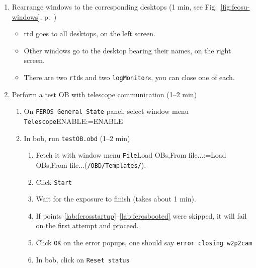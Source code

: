 \documentclass[11pt,fleqn]{book}
\makeatletter
\def\menu#1#2{\texttt{#1}\ifx{}#2\else\@for\@x:=#2\do{$\rightarrow$\texttt{\@x}}\fi}
\def\wmenu#1#2{window menu \menu{#1}{#2}}
\def\fetchob{\wmenu{File}{Load OBs,From file...}}
\def\figref#1{Fig.~\ref{fig:#1}, p.~\pageref{fig:#1}}
\makeatother
\begin{document}
\begin{enumerate}
\begin{enumerate}
\begin{enumerate}
                \item Wait for the large, grey window to close itself (3 min)
                \item\label{lab:ferosonline} Put the instrument online (1 min)
                \begin{enumerate}
                   \item On \texttt{FEROS General State} panel, use \wmenu{Instrument}{ONLINE}
                   \item Wait for \texttt{State} to indicate \texttt{ONLINE}
                \end{enumerate}
            \end{enumerate}
         \item \label{lab:ferosbooted} Rearrange windows to the corresponding desktops (1 min, see \figref{feosu-windows})
            \begin{itemize}
              \item \gls{rtd} goes to all desktops, on the left screen.
              \item Other windows go to the desktop bearing their names, on the right screen.
              \item There are two \texttt{rtd}s and two \texttt{logMonitor}s, you can close one of each.
           \end{itemize}
         \item Perform a test OB with telescope communication (1--2 min)
           \begin{enumerate}
             \item On \texttt{FEROS General State} panel, select \wmenu{Telescope}{ENABLE} 
             \item In \gls{bob}, run \texttt{testOB.obd} (1--2 min)
             \begin{enumerate}
               \item Fetch it with \fetchob (\texttt{/OBD/Templates/}).
               \item \label{list:ferostestob} Click \texttt{Start} 
               \item Wait for the exposure to finish (takes about 1 min).
               \item If points \ref{lab:ferosstartup}--\ref{lab:ferosbooted} were skipped, it will fail on the first attempt and proceed.
              \item Click \texttt{OK} on the error popups, one should say \texttt{error closing w2p2cam}
              \item In \gls{bob}, click on \texttt{Reset status}

\end{enumerate}
\end{enumerate}
\end{enumerate}
\end{enumerate}
\end{document}
